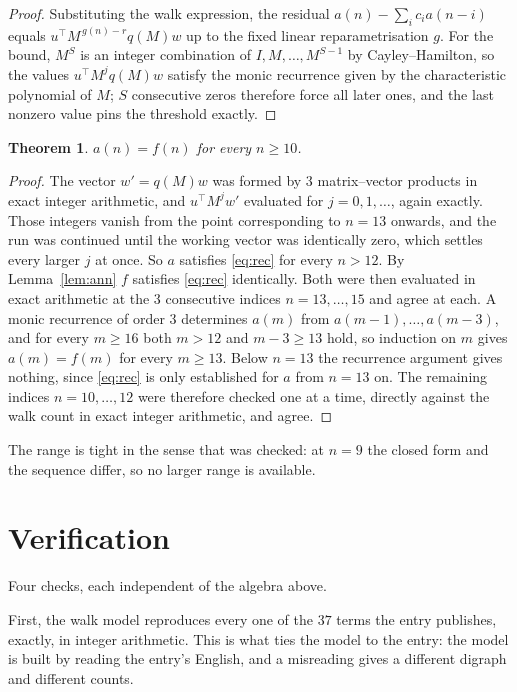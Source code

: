 \documentclass[11pt,a4paper]{article}
\theoremstyle{plain}
\newtheorem{theorem}{Theorem}
\theoremstyle{definition}
\begin{document}
\begin{proof}
Substituting the walk expression, the residual $a(n)-\sum_ic_ia(n-i)$ equals
$u^{\!\top}M^{\,g(n)-r}q(M)w$ up to the fixed linear reparametrisation $g$. For the bound,
$M^{S}$ is an integer combination of $I,M,\dots,M^{S-1}$ by Cayley--Hamilton, so the values
$u^{\!\top}M^{j}q(M)w$ satisfy the monic recurrence given by the characteristic polynomial of
$M$; $S$ consecutive zeros therefore force all later ones, and the last nonzero value pins the
threshold exactly.
\end{proof}

\begin{theorem}
$a(n)=f(n)$ for every $n\ge10$.
\end{theorem}

\begin{proof}
The vector $w'=q(M)w$ was formed by $3$ matrix--vector products in exact integer
arithmetic, and $u^{\!\top}M^{j}w'$ evaluated for $j=0,1,\dots$, again exactly. Those integers
vanish from the point corresponding to $n=13$ onwards, and the run was continued until the
working vector was identically zero, which settles every larger $j$ at once. So $a$ satisfies
\eqref{eq:rec} for every $n>12$. By Lemma~\ref{lem:ann} $f$ satisfies \eqref{eq:rec}
identically. Both were then evaluated in exact arithmetic at the $3$ consecutive indices
$n=13,\dots,15$ and agree at each. A monic recurrence of order $3$
determines $a(m)$ from $a(m-1),\dots,a(m-3)$, and for every $m\ge16$ both
$m>12$ and $m-3\ge13$ hold, so induction on $m$ gives $a(m)=f(m)$ for every
$m\ge13$.
Below $n=13$ the recurrence argument gives nothing, since \eqref{eq:rec} is only
established for $a$ from $n=13$ on. The remaining indices $n=10,\dots,12$ were
therefore checked one at a time, directly against the walk count in exact integer arithmetic,
and agree.
\end{proof}

The range is tight in the sense that was checked: at $n=9$ the closed form and the sequence differ, so no larger range is available.

\section{Verification}

Four checks, each independent of the algebra above.

First, the walk model reproduces every one of the $37$ terms the entry publishes,
exactly, in integer arithmetic. This is what ties the model to the entry: the model is built
by reading the entry's English, and a misreading gives a different digraph and different
counts.
\end{document}

